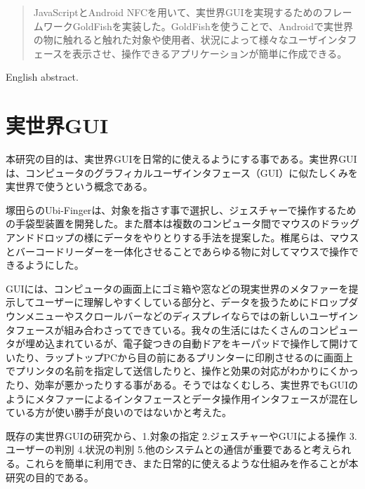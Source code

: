 
\begin{abstract}
JavaScriptとAndroid NFCを用いて、実世界GUIを実現するためのフレームワークGoldFishを実装した。GoldFishを使うことで、Androidで実世界の物に触れると触れた対象や使用者、状況によって様々なユーザインタフェースを表示させ、操作できるアプリケーションが簡単に作成できる。
\end{abstract}

\begin{eabstract}
English abstract.
\end{eabstract}

\maketitle

\section{実世界GUI}\label{sec:Introduction}
本研究の目的は、実世界GUI\cite{実世界GUI}を日常的に使えるようにする事である。実世界GUIは、コンピュータのグラフィカルユーザインタフェース（GUI）に似たしくみを実世界で使うという概念である。

塚田らのUbi-Finger\cite{Ubi-Finger}は、対象を指さす事で選択し、ジェスチャーで操作するための手袋型装置を開発した。また暦本は複数のコンピュータ間でマウスのドラッグアンドドロップの様にデータをやりとりする手法\cite{pick-and-drop}を提案した。椎尾らは、マウスとバーコードリーダーを一体化させることであらゆる物に対してマウスで操作できるようにした。\cite{field-mouse}

GUIには、コンピュータの画面上にゴミ箱や窓などの現実世界のメタファーを提示してユーザーに理解しやすくしている部分と、データを扱うためにドロップダウンメニューやスクロールバーなどのディスプレイならではの新しいユーザインタフェースが組み合わさってできている。我々の生活にはたくさんのコンピュータが埋め込まれているが、電子錠つきの自動ドアをキーパッドで操作して開けていたり、ラップトップPCから目の前にあるプリンターに印刷させるのに画面上でプリンタの名前を指定して送信したりと、操作と効果の対応がわかりにくかったり、効率が悪かったりする事がある。そうではなくむしろ、実世界でもGUIのようにメタファーによるインタフェースとデータ操作用インタフェースが混在している方が使い勝手が良いのではないかと考えた。

既存の実世界GUIの研究から、1.対象の指定 2.ジェスチャーやGUIによる操作 3.ユーザーの判別 4.状況の判別 5.他のシステムとの通信が重要であると考えられる。これらを簡単に利用でき、また日常的に使えるような仕組みを作ることが本研究の目的である。



